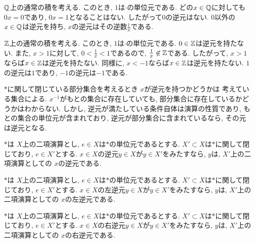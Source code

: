\begin{example}
  $\mathbb{Q}$上の通常の積を考える.
  このとき, $1$は$\cdot$の単位元である.
  どの$x\in\mathbb{Q}$に対しても$0x=0$であり,
  $0x=1$となることはない.
  したがって$0$の逆元はない.
  $0$以外の$x\in \mathbb{Q}$は逆元を持ち,
  $x$の逆元はその逆数$\frac{1}{x}$である.
\end{example}
\begin{example}
  $\mathbb{Z}$上の通常の積を考える.
  このとき, $1$は$\cdot$の単位元である.
  $0\in\mathbb{Z}$は逆元を持たない.
  また, $x>1$に対して,
  $0<\frac{1}{x}<1$であるので,
  $\frac{1}{x}\not\in \mathbb{Z}$である.
  したがって, $x>1$ならば$x\in\mathbb{Z}$は逆元を持たない.
  同様に, $x<-1$ならば$x\in \mathbb{Z}$は逆元を持たない.
  $1$の逆元は$1$であり,
  $-1$の逆元は$-1$である.
\end{example}

$\ast$に関して閉じている部分集合を考えるとき
$x$が逆元を持つかどうかは
考えている集合による.
$x^{-1}$がもとの集合に存在していても,
部分集合に存在しているかどうかはわからない.
しかし,
逆元が満たしている条件自体は演算の性質であり,
もとの集合の単位元が含まれており,
逆元が部分集合に含まれているなら,
その元は逆元となる.
\begin{prop}
  $\ast$は
  $X$上の二項演算とし,
  $e\in X$は$\ast$の単位元であるとする.
  $X'\subset X$は$\ast$に関して閉じており,
  $e\in X'$とする.
  $x\in X$の逆元$y\in X$が$y\in X'$をみたすなら,
  $y$は,
  $X'$上の二項演算としての
  $x$の逆元である.
\end{prop}
\begin{prop}
  $\ast$は
  $X$上の二項演算とし,
  $e\in X$は$\ast$の単位元であるとする.
  $X'\subset X$は$\ast$に関して閉じており,
  $e\in X'$とする.
  $x\in X$の左逆元$y\in X$が$y\in X'$をみたすなら,
  $y$は,
  $X'$上の二項演算としての
  $x$の左逆元である.
\end{prop}
\begin{prop}
  $\ast$は
  $X$上の二項演算とし,
  $e\in X$は$\ast$の単位元であるとする.
  $X'\subset X$は$\ast$に関して閉じており,
  $e\in X'$とする.
  $x\in X$の右逆元$y\in X$が$y\in X'$をみたすなら,
  $y$は,
  $X'$上の二項演算としての
  $x$の右逆元である.
\end{prop}


